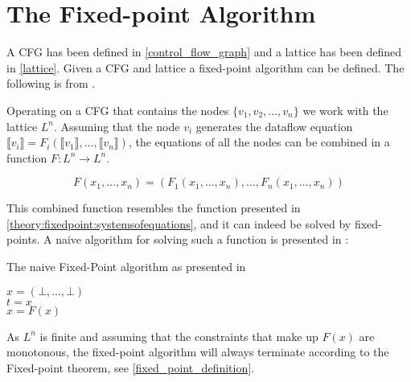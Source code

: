 \section{The Fixed-point Algorithm}\label{fixed_point_algorithm}
A CFG has been defined in \cref{control_flow_graph} and a lattice has been defined in \cref{lattice}.
Given a CFG and lattice a fixed-point algorithm can be defined.
The following is from \citet{schwartzbach}.


Operating on a CFG that contains the nodes $\{ v_1, v_2, \dots, v_n \}$ we work with the lattice $L^n$.
Assuming that the node $v_i$ generates the dataflow equation $\llbracket v_i \rrbracket = F_i ( \llbracket v_1 \rrbracket, \dots, \llbracket v_n \rrbracket)$, the equations of all the nodes can be combined in a function $ F: L^n \rightarrow L^n$.

\[ F(x_1, \dots, x_n) = (F_1(x_1, \dots, x_n), \dots, F_n(x_1, \dots, x_n)) \]

This combined function resembles the function presented in \cref{theory:fixedpoint:systemsofequations}, and it can indeed be solved by fixed-points.
A naive algorithm for solving such a function is presented in \citet{schwartzbach}:

\begin{algorithm}
  \caption{The naive Fixed-Point algorithm as presented in \citet[p.18~]{schwartzbach}}\label{fixed-point_algo}  
  \DontPrintSemicolon
  $x = (\bot, \dots, \bot)$ \\
         {
           $t = x$\\
           $x = F(x)$
         }
\end{algorithm}

As $L^n$ is finite and assuming that the constraints that make up $F(x)$ are monotonous, the fixed-point algorithm will always terminate according to the Fixed-point theorem, see \cref{fixed_point_definition}.

